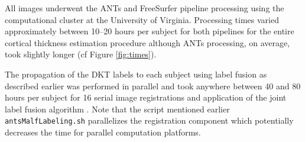 All images underwent the ANTs and FreeSurfer pipeline processing 
using the computational cluster at the University of Virginia.  
Processing times varied approximately between 10--20 hours per subject
for both pipelines for the entire cortical thickness estimation procedure
although ANTs processing, on average, took slightly longer (cf Figure \ref{fig:times}).

The propagation of the DKT labels to each subject using label fusion as described earlier
was performed in parallel and took anywhere between 40 and 80 hours per 
subject for 16 serial image registrations and application of the joint label fusion algorithm \citep{wang2013}.  Note that the script mentioned earlier {\tt antsMalfLabeling.sh} parallelizes
the registration component which potentially decreases the time for parallel computation platforms.
 
 
 

